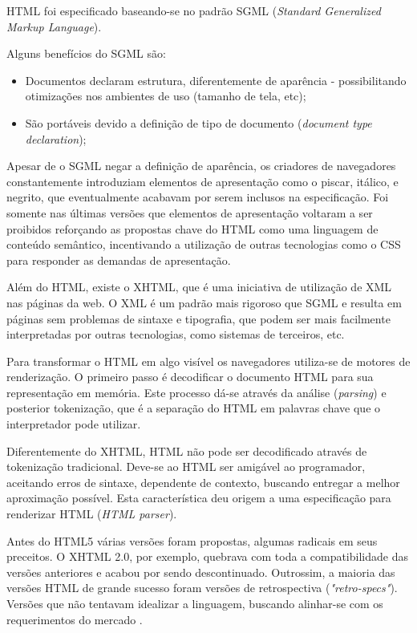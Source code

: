 \documentclass[
12pt,
a4paper,
portuges,
draft
]{report}
\begin{document}
HTML foi especificado baseando-se no padrão SGML (\textit{Standard Generalized
Markup Language}).

Alguns benefícios do SGML são:
\begin{itemize}
    \item Documentos declaram estrutura, diferentemente de aparência
- possibilitando otimizações nos ambientes de uso (tamanho de tela,
etc);
    \item São portáveis devido a definição de tipo de documento
(\textit{document type declaration});
\end{itemize}

Apesar de o SGML negar a definição de aparência, os criadores de
navegadores constantemente introduziam elementos de apresentação como o
piscar, itálico, e negrito, que eventualmente acabavam por serem inclusos
na especificação. Foi somente nas últimas versões que elementos de
apresentação voltaram a ser proibidos reforçando as propostas chave
do HTML como uma linguagem de conteúdo semântico, incentivando a
utilização de outras tecnologias como o CSS para responder as demandas de
apresentação.

Além do HTML, existe o XHTML, que é uma iniciativa de utilização
de XML nas páginas da web. O XML é um padrão mais rigoroso que SGML
e resulta em páginas sem problemas de sintaxe e tipografia, 
que podem ser mais facilmente interpretadas por
outras tecnologias, como sistemas de terceiros, etc.

Para transformar o HTML em algo visível os navegadores utiliza-se
de motores de renderização. O primeiro passo é decodificar o documento HTML
para sua representação em memória. Este processo dá-se através
da análise (\textit{parsing}) e posterior tokenização, que é a separação
do HTML em palavras chave que o interpretador pode utilizar.

Diferentemente do XHTML, HTML não pode ser decodificado através de
tokenização tradicional. Deve-se ao HTML ser amigável ao programador,
aceitando erros de sintaxe, dependente de contexto, buscando entregar a
melhor aproximação possível. Esta característica deu origem a uma
especificação para renderizar HTML (\textit{HTML parser}).

Antes do HTML5 várias versões foram propostas, algumas radicais
em seus preceitos. O XHTML 2.0, por exemplo, quebrava com toda
a compatibilidade das versões anteriores e acabou por sendo descontinuado.
Outrossim, a maioria das versões HTML de grande sucesso foram versões de
retrospectiva (\textit{"retro-specs"}). Versões que não tentavam
idealizar a linguagem, buscando alinhar-se com os requerimentos do
mercado \autocite{diveIntohtml}.
\end{document}
